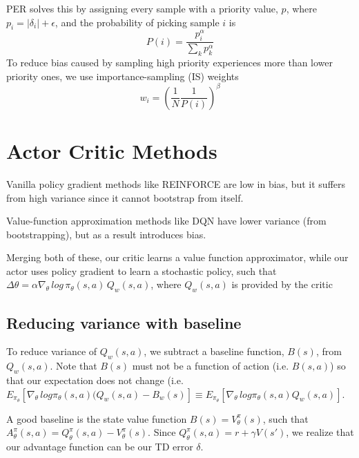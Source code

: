 \documentclass[11pt]{article} %
\begin{document}
PER solves this by assigning every sample with a priority value, $p$, where $p_i = |\delta_i| + \epsilon$, and the probability of picking sample $i$ is
\begin{equation*}
    P(i) = \frac{p_i^\alpha}{\sum_k p_k^\alpha}
\end{equation*}
To reduce bias caused by sampling high priority experiences more than lower priority ones, we use importance-sampling (IS) weights
\begin{equation*}
    w_i = (\frac{1}{N}\frac{1}{P(i)})^\beta
\end{equation*}

\section{Actor Critic Methods}
Vanilla policy gradient methods like REINFORCE are low in bias, but it suffers from high variance since it cannot bootstrap from itself.

Value-function approximation methods like DQN have lower variance (from bootstrapping), but as a result introduces bias.

Merging both of these, our critic learns a value function approximator, while our actor uses policy gradient to learn a stochastic policy, such that $\Delta\theta = \alpha \nabla_\theta\, log\, \pi_\theta (s,a)\, Q_w(s,a)$, where $Q_w(s,a)$ is provided by the critic
\subsection{Reducing variance with baseline}
To reduce variance of $Q_w(s,a)$, we subtract a baseline function, $B(s)$, from $Q_w(s,a)$. Note that $B(s)$ must not be a function of action (i.e. $B(s,a)$) so that our expectation does not change (i.e. $E_{\pi_\theta}[\nabla_\theta\,log\pi_\theta(s,a)(Q_w(s,a)-B_w(s)] \equiv E_{\pi_\theta}[\nabla_\theta\,log\pi_\theta(s,a)Q_w(s,a)]$.

A good baseline is the state value function $B(s)=V^\pi_\theta(s)$, such that $A^\pi_\theta(s,a) = Q^\pi_\theta(s,a) - V^\pi_\theta(s)$. Since $Q^\pi_\theta(s,a)=r+\gamma V(s')$, we realize that our advantage function can be our TD error $\delta$.
\end{document}
